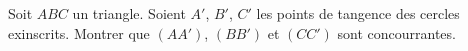 Soit $ABC$ un triangle. Soient $A'$, $B'$, $C'$ les points de tangence des cercles exinscrits. Montrer que $(AA')$, $(BB')$ et $(CC')$ sont concourrantes.
